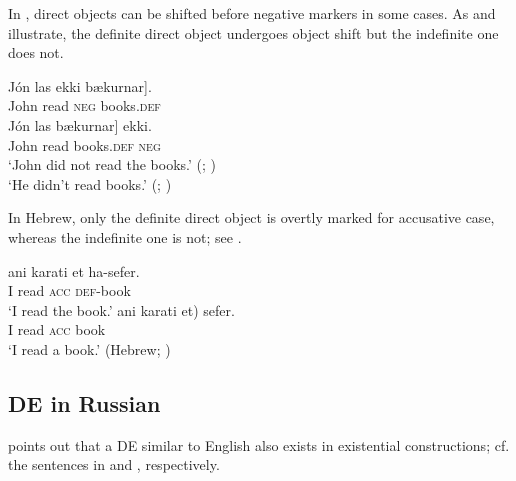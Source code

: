 \documentclass[output=paper]{langscibook}
\begin{document}
\noindent In , direct objects can be shifted before negative markers in some cases. As  and  illustrate, the definite direct object undergoes object shift but the indefinite one does not.

\ea\label{ice1}
    \ea
    \gll	Jón las ekki \minsp{[} bækurnar].\\
		John read \textsc{neg} {} books.\textsc{def}\\
    \ex
    \gll	Jón las \minsp{[} bækurnar] ekki.\\
		John read {} books.\textsc{def} \textsc{neg}\\
	\z
\glt	`John did not read the books.' \hfill (; \citealt[392]{Collins.Thrainsson1996}) \\
\ex\label{ice2}
    \z
\glt `He didn't read books.' \hfill (; \citealt[24]{Ritter.Rosen2005})
\z

\noindent In Hebrew, only the definite direct object is overtly marked for accusative case, whereas the indefinite one is not; see .

\ea \label{heb}
\ea \gll ani karati et ha-sefer.\\
I read \textsc{acc} \textsc{def}-book\\
\glt `I read the book.'
\ex
\gll	ani karati \minsp{(*} et) sefer.\\
I read {} \textsc{acc} book\\
\glt	`I read a book.'
\hfill (Hebrew; \citealt[24]{Ritter.Rosen2005})
\z\z

\subsection{DE in Russian}

\citet{Paducheva2000} points out that a DE similar to English also exists in  existential constructions; cf. the sentences in  and , respectively.
\end{document}
